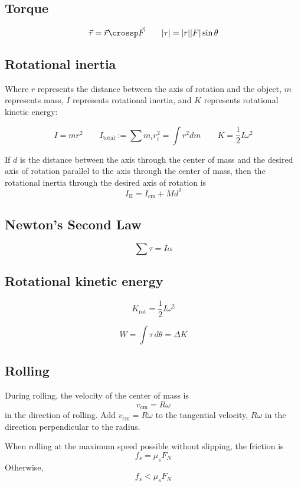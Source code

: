 \subsection{Torque}

\[
	\vec{\tau} = \vec{r} \crossp \vec{F} \qquad |\tau| = |r| |F| \sin \theta
\]

\subsection{Rotational inertia}

Where $r$ represents the distance between the axis of rotation and the object, $m$ represents mass, $I$ represents rotational inertia, and $K$ represents rotational kinetic energy:

\[
	I = mr^2 \qquad I_\text{total} := \sum m_i r_i^2 = \int r^2 dm \qquad K = \frac{1}{2} I \omega^2
\]

\begin{namedtheorem}
	If $d$ is the distance between the axis through the center of mass and the desired axis of rotation parallel to the axis through the center of mass, then the rotational inertia through the desired axis of rotation is
	\[
		I_{\text{II}} = I_{\text{cm}} + Md^2
	\]
\end{namedtheorem}

\subsection{Newton's Second Law}

\[
	\sum \tau = I \alpha
\]

\subsection{Rotational kinetic energy}

\begin{definition}
	\[
		K_{\text{rot}} = \frac{1}{2} I \omega^2
	\]
\end{definition}

\begin{definition}
	\[
		W = \int \tau \,d\theta = \Delta K
	\]
\end{definition}

\subsection{Rolling}

During rolling, the velocity of the center of mass is
\[
	v_\text{cm} = R\omega
\]
in the direction of rolling. Add $v_\text{cm} = R\omega$ to the tangential velocity, $R\omega$ in the direction perpendicular to the radius.

When rolling at the maximum speed possible without slipping, the friction is
\[
	f_s = \mu_s F_N
\]
Otherwise,
\[
	f_s < \mu_s F_N
\]
